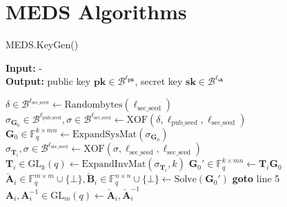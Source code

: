 \appendix
\chapter{MEDS Algorithms}
\label{app:medsalgs}

\begin{algorithm}[H]
\caption{MEDS.KeyGen()}\label{alg:medskeygen}
\hspace*{\algorithmicindent} \textbf{Input:} -\\
\hspace*{\algorithmicindent} \textbf{Output:} public key $\textbf{pk} \in \mathcal{B}^{\ell_\textbf{pk}}$, secret key $\textbf{sk} \in \mathcal{B}^{\ell_\textbf{sk}}$
\begin{algorithmic}[1]
\State $\delta \in \mathcal{B}^{\ell_\text{sec\_seed}} \gets \text{Randombytes}(\ell_\text{sec\_seed})$
\State $\sigma_{\textbf{G}_0} \in \mathcal{B}^{\ell_\text{pub\_seed}}, \sigma \in \mathcal{B}^{\ell_\text{sec\_seed}} \gets \text{XOF}(\delta, \ell_\text{pub\_seed}, \ell_\text{sec\_seed})$
\State $\textbf{G}_0 \in \mathds{F}_q^{k \times mn} \gets \text{ExpandSysMat}(\sigma_{\textbf{G}_0})$
    \State $\sigma_{\textbf{T}_i}, \sigma \in \mathcal{B}^{\ell_\text{sec\_seed}} \gets \text{XOF}(\sigma, \ell_\text{sec\_seed}, \ell_\text{sec\_seed})$
    \State $\textbf{T}_i \in \text{GL}_k(q) \gets \text{ExpandInvMat}(\sigma_{\textbf{T}_i}, k)$
    \State $\textbf{G}_0' \in \mathds{F}_q^{k \times mn} \gets \textbf{T}_i \textbf{G}_0$
    \State $\check{\textbf{A}}_i \in \mathds{F}_q^{m \times m} \cup \{\bot\}, \check{\textbf{B}}_i \in \mathds{F}_q^{n \times n} \cup \{\bot\} \gets \text{Solve}(\textbf{G}_0')$
        \State \textbf{goto} line 5
    \EndIf
    \State $\textbf{A}_i, \textbf{A}_i^{-1} \in \text{GL}_m(q) \gets \check{\textbf{A}}_i, \check{\textbf{A}}_i^{-1}$

\end{algorithmic}
\end{algorithm}
